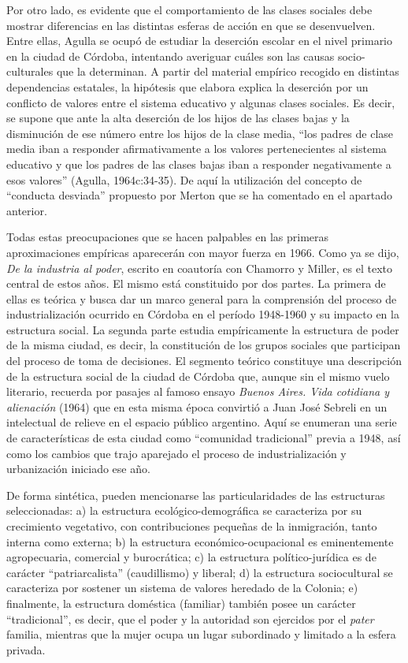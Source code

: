 Por otro lado, es evidente que el comportamiento de las clases sociales debe mostrar diferencias en las distintas esferas de acción en que se desenvuelven. Entre ellas, Agulla se ocupó de estudiar la deserción escolar en el nivel primario en la ciudad de Córdoba, intentando averiguar cuáles son las causas socio-culturales que la determinan. A partir del material empírico recogido en distintas dependencias estatales, la hipótesis que elabora explica la deserción por un conflicto de valores entre el sistema educativo y algunas clases sociales. Es decir, se supone que ante la alta deserción de los hijos de las clases bajas y la disminución de ese número entre los hijos de la clase media, ``los padres de clase media iban a responder afirmativamente a los valores pertenecientes al sistema educativo y que los padres de las clases bajas iban a responder negativamente a esos valores'' (Agulla, 1964c:34-35). De aquí la utilización del concepto de ``conducta desviada'' propuesto por Merton que se ha comentado en el apartado anterior.

Todas estas preocupaciones que se hacen palpables en las primeras aproximaciones empíricas aparecerán con mayor fuerza en 1966. Como ya se dijo, \emph{De la industria al poder}, escrito en coautoría con Chamorro y Miller, es el texto central de estos años. El mismo está constituido por dos partes. La primera de ellas es teórica y busca dar un marco general para la comprensión del proceso de industrialización ocurrido en Córdoba en el período 1948-1960 y su impacto en la estructura social. La segunda parte estudia empíricamente la estructura de poder de la misma ciudad, es decir, la constitución de los grupos sociales que participan del proceso de toma de decisiones. El segmento teórico constituye una descripción de la estructura social de la ciudad de Córdoba que, aunque sin el mismo vuelo literario, recuerda por pasajes al famoso ensayo \emph{Buenos Aires. Vida cotidiana y alienación} (1964) que en esta misma época convirtió a Juan José Sebreli en un intelectual de relieve en el espacio público argentino. Aquí se enumeran una serie de características de esta ciudad como ``comunidad tradicional'' previa a 1948, así como los cambios que trajo aparejado el proceso de industrialización y urbanización iniciado ese año.

De forma sintética, pueden mencionarse las particularidades de las estructuras seleccionadas: a) la estructura ecológico-demográfica se caracteriza por su crecimiento vegetativo, con contribuciones pequeñas de la inmigración, tanto interna como externa; b) la estructura económico-ocupacional es eminentemente agropecuaria, comercial y burocrática; c) la estructura político-jurídica es de carácter ``patriarcalista'' (caudillismo) y liberal; d) la estructura sociocultural se caracteriza por sostener un sistema de valores heredado de la Colonia; e) finalmente, la estructura doméstica (familiar) también posee un carácter ``tradicional'', es decir, que el poder y la autoridad son ejercidos por el \emph{pater} familia, mientras que la mujer ocupa un lugar subordinado y limitado a la esfera privada.

